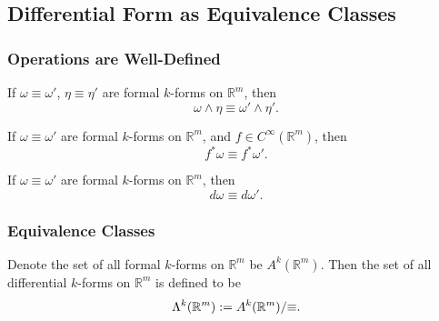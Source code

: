 \documentclass[../main.tex]{subfiles}
\begin{document}
    \subsection{Differential Form as Equivalence Classes}
    \subsubsection{Operations are Well-Defined}
    \begin{theorem}
        If \(\omega\equiv \omega'\), \(\eta \equiv \eta'\) are formal \(k\)-forms on 
        \(\mathbb{R}^m\), 
        then 
        \[
        \omega \wedge \eta \equiv \omega' \wedge \eta'.
        \]
    \end{theorem}
    \begin{theorem}
        If \(\omega \equiv \omega'\) are formal \(k\)-forms on \(\mathbb{R}^m\), 
        and \(f \in C^\infty(\mathbb{R}^m)\), then 
        \[
        f^*\omega \equiv f^*\omega'.
        \]
    \end{theorem}
    \begin{theorem}
        If \(\omega \equiv \omega'\) are formal \(k\)-forms on \(\mathbb{R}^m\), 
        then 
        \[
        d\omega\equiv d\omega'.
        \]
    \end{theorem}
    \subsubsection{Equivalence Classes}
    \begin{definition}\label{def:euc-form}
        Denote the set of all formal \(k\)-forms on \(\mathbb{R}^m\) be 
        \(A^k(\mathbb{R}^m)\). Then the set of all differential \(k\)-forms on 
        \(\mathbb{R}^m\) is defined to be 
        \[
        \Lambda^{k}(\mathbb{R}^{m}) := A^k(\mathbb{R}^m) / {\equiv}.
        \]
    \end{definition}
\end{document}
